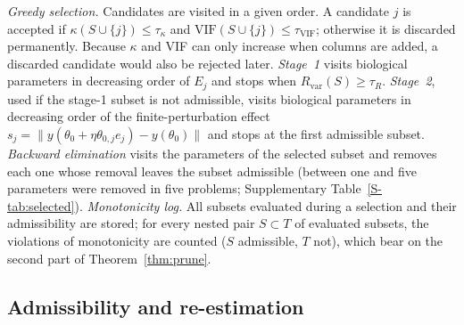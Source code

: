 \documentclass[pdflatex,sn-nature]{sn-jnl}
\theoremstyle{plain}
\begin{document}
\emph{Greedy selection.} Candidates are visited in a given order. A candidate $j$ is accepted if $\kappa(S\cup\{j\})\le\tau_\kappa$ and $\mathrm{VIF}(S\cup\{j\})\le\tau_{\mathrm{VIF}}$; otherwise it is discarded permanently. Because $\kappa$ and VIF can only increase when columns are added, a discarded candidate would also be rejected later. \emph{Stage~1} visits biological parameters in decreasing order of $E_j$ and stops when $R_{\mathrm{var}}(S)\ge\tau_R$. \emph{Stage~2}, used if the stage-1 subset is not admissible, visits biological parameters in decreasing order of the finite-perturbation effect $s_j=\|y(\theta_0+\eta\theta_{0,j}e_j)-y(\theta_0)\|$ and stops at the first admissible subset. \emph{Backward elimination} visits the parameters of the selected subset and removes each one whose removal leaves the subset admissible (between one and five parameters were removed in five problems; Supplementary Table~\ref{S-tab:selected}). \label{met:monotonicity}\emph{Monotonicity log.} All subsets evaluated during a selection and their admissibility are stored; for every nested pair $S\subset T$ of evaluated subsets, the violations of monotonicity are counted ($S$ admissible, $T$ not), which bear on the second part of Theorem~\ref{thm:prune}.

\subsection*{Admissibility and re-estimation}\label{met:adm}
\end{document}
